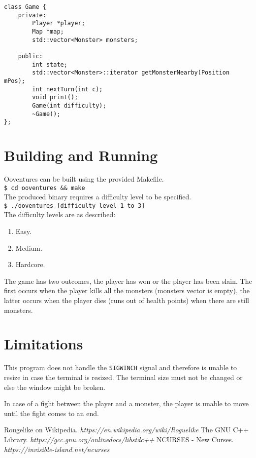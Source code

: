 \documentclass[a4paper,12pt]{article}
\begin{document}
\begin{lstlisting}
class Game {
	private:
		Player *player;
		Map *map;
		std::vector<Monster> monsters;

	public:
		int state;
		std::vector<Monster>::iterator getMonsterNearby(Position mPos);
		int nextTurn(int c);
		void print();
		Game(int difficulty);
		~Game();
};
\end{lstlisting}

\newpage

\section{Building and Running}
Ooventures can be built using the provided Makefile.\\
\verb|$ cd ooventures && make|\\
The produced binary requires a difficulty level to be specified.\\
\verb|$ ./ooventures [difficulty level 1 to 3]|\\
The difficulty levels are as described:
\begin{enumerate}
  \item Easy.
  \item Medium.
  \item Hardcore.
\end{enumerate}
The game has two outcomes, the player has won or the player has been slain. The first occurs when the player kills all the monsters (monsters vector is empty), the latter occurs when the player dies (runs out of health points) when there are still monsters.

\section{Limitations}
This program does not handle the \verb|SIGWINCH| signal and therefore is unable to resize in case the terminal is resized. The terminal size must not be changed or else the window might be broken.

In case of a fight between the player and a monster, the player is unable to move until the fight comes to an end.

\begin{thebibliography}{1}
   Rougelike on Wikipedia. \emph{https://en.wikipedia.org/wiki/Roguelike}
   The GNU C++ Library. \emph{https://gcc.gnu.org/onlinedocs/libstdc++}
   NCURSES - New Curses. \emph{https://invisible-island.net/ncurses}
\end{thebibliography}
\end{document}
